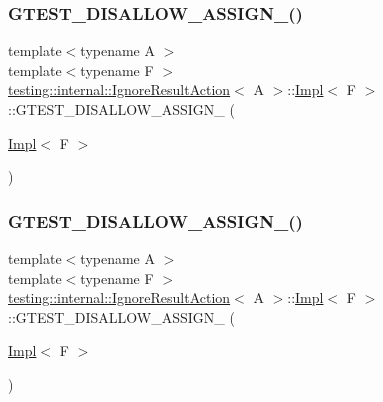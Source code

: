 \subsubsection{\texorpdfstring{GTEST\_DISALLOW\_ASSIGN\_()}{GTEST\_DISALLOW\_ASSIGN\_()}\hspace{0.1cm}{\footnotesize\ttfamily [2/3]}}
{\footnotesize\ttfamily template$<$typename A $>$ \\
template$<$typename F $>$ \\
\mbox{\hyperlink{classtesting_1_1internal_1_1_ignore_result_action}{testing\+::internal\+::\+Ignore\+Result\+Action}}$<$ A $>$\+::\mbox{\hyperlink{classtesting_1_1internal_1_1_ignore_result_action_1_1_impl}{Impl}}$<$ F $>$\+::G\+T\+E\+S\+T\+\_\+\+D\+I\+S\+A\+L\+L\+O\+W\+\_\+\+A\+S\+S\+I\+G\+N\+\_\+ (\begin{DoxyParamCaption}\item[{\mbox{\hyperlink{classtesting_1_1internal_1_1_ignore_result_action_1_1_impl}{Impl}}$<$ F $>$}]{ }\end{DoxyParamCaption})\hspace{0.3cm}{\ttfamily [private]}}

\mbox{\label{classtesting_1_1internal_1_1_ignore_result_action_1_1_impl_a9e4a21770e75deb8438e6ef633a638f5}} 
\subsubsection{\texorpdfstring{GTEST\_DISALLOW\_ASSIGN\_()}{GTEST\_DISALLOW\_ASSIGN\_()}\hspace{0.1cm}{\footnotesize\ttfamily [3/3]}}
{\footnotesize\ttfamily template$<$typename A $>$ \\
template$<$typename F $>$ \\
\mbox{\hyperlink{classtesting_1_1internal_1_1_ignore_result_action}{testing\+::internal\+::\+Ignore\+Result\+Action}}$<$ A $>$\+::\mbox{\hyperlink{classtesting_1_1internal_1_1_ignore_result_action_1_1_impl}{Impl}}$<$ F $>$\+::G\+T\+E\+S\+T\+\_\+\+D\+I\+S\+A\+L\+L\+O\+W\+\_\+\+A\+S\+S\+I\+G\+N\+\_\+ (\begin{DoxyParamCaption}\item[{\mbox{\hyperlink{classtesting_1_1internal_1_1_ignore_result_action_1_1_impl}{Impl}}$<$ F $>$}]{ }\end{DoxyParamCaption})\hspace{0.3cm}{\ttfamily [private]}}

